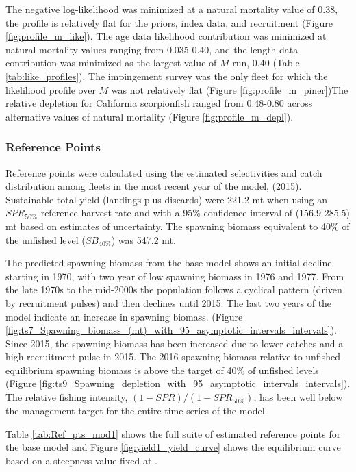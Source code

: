 \documentclass[12pt,]{article}
\begin{document}
The negative log-likelihood was minimized at a natural mortality value
of 0.38, the profile is relatively flat for the priors, index data, and
recruitment (Figure \ref{fig:profile_m_like}). The age data likelihood
contribution was minimized at natural mortality values ranging from
0.035-0.40, and the length data contribution was minimized as the
largest value of \(M\) run, 0.40 (Table \ref{tab:like_profiles}). The
impingement survey was the only fleet for which the likelihood profile
over \(M\) was not relatively flat (Figure \ref{fig:profile_m_piner})The
relative depletion for California scorpionfish ranged from 0.48-0.80
across alternative values of natural mortality (Figure
\ref{fig:profile_m_depl}).

\subsubsection{Reference Points}\label{reference-points-1}

Reference points were calculated using the estimated selectivities and
catch distribution among fleets in the most recent year of the model,
(2015). Sustainable total yield (landings plus discards) were 221.2 mt
when using an \(SPR_{50\%}\) reference harvest rate and with a 95\%
confidence interval of (156.9-285.5) mt based on estimates of
uncertainty. The spawning biomass equivalent to 40\% of the unfished
level (\(SB_{40\%}\)) was 547.2 mt.

The predicted spawning biomass from the base model shows an initial
decline starting in 1970, with two year of low spawning biomass in 1976
and 1977. From the late 1970s to the mid-2000s the population follows a
cyclical pattern (driven by recruitment pulses) and then declines until
2015. The last two years of the model indicate an increase in spawning
biomass. (Figure
\ref{fig:ts7_Spawning_biomass_(mt)_with_95_asymptotic_intervals_intervals}).
Since 2015, the spawning biomass has been increased due to lower catches
and a high recruitment pulse in 2015. The 2016 spawning biomass relative
to unfished equilibrium spawning biomass is above the target of 40\% of
unfished levels (Figure
\ref{fig:ts9_Spawning_depletion_with_95_asymptotic_intervals_intervals}).
The relative fishing intensity, \((1-SPR)/(1-SPR_{50\%})\), has been
well below the management target for the entire time series of the
model.

Table \ref{tab:Ref_pts_mod1} shows the full suite of estimated reference
points for the base model and Figure \ref{fig:yield1_yield_curve} shows
the equilibrium curve based on a steepness value fixed at .
\end{document}
